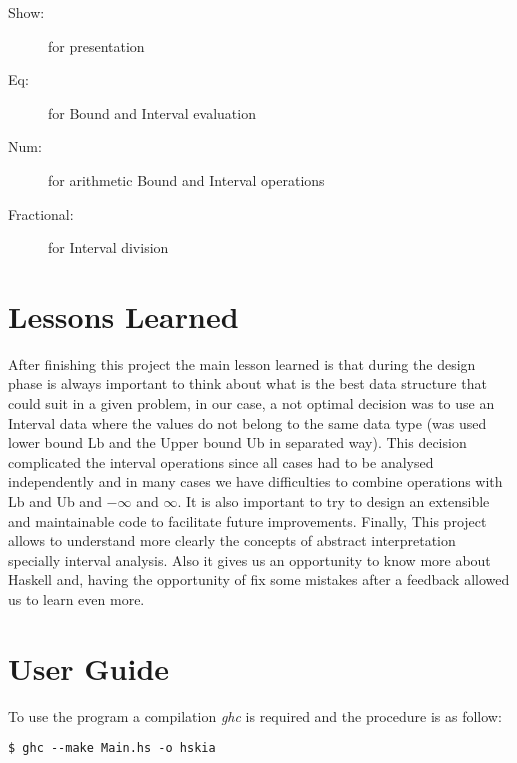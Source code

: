 \documentclass{article}
\begin{document}
\begin{description}
  \item[Show:] for presentation
  \item[Eq:] for Bound and Interval evaluation
  \item[Num:] for arithmetic Bound and Interval operations
  \item[Fractional:] for Interval division

\end{description}
  



\section{Lessons Learned}

After finishing this project the main lesson learned is that during the design phase is always important to think about what is the best data structure that could suit in a  given problem, in our case, a not optimal decision was to use an Interval data where the values do not belong to the same data type (was used lower bound Lb and the Upper bound Ub in separated way). This decision complicated the interval operations since all cases had to be analysed independently and in many cases we have difficulties to combine operations with Lb and Ub  and $-\infty$  and $\infty$. It is also important to try to design an extensible and maintainable code to facilitate future improvements.
Finally, This project allows to understand more clearly the concepts of abstract interpretation specially interval analysis. Also it gives us an opportunity to know more about Haskell and, having the opportunity of fix some mistakes after a feedback allowed us to learn even more.

% 
% 


\section{User Guide}
To use the program a compilation \emph{ghc} is required and the procedure is as follow:
\begin{verbatim}
$ ghc --make Main.hs -o hskia
\end{verbatim}
\end{document}
